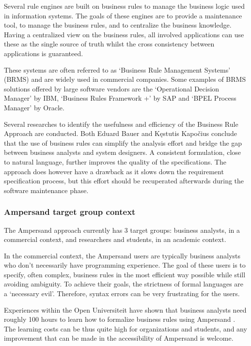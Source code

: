 Several rule engines are built on business rules to manage the business logic used in information systems. 
The goals of these engines are to provide a maintenance tool, to manage the business rules, and to centralize the business knowledge.
Having a centralized view on the business rules, all involved  applications can use these as the single source of truth whilst the cross consistency between applications is guaranteed.

%
These systems are often referred to as `Business Rule Management Systems' (BRMS) and are widely used in commercial companies.
%
Some examples of BRMS solutions offered by large software vendors are the `Operational Decision Manager' by IBM, `Business Rules Framework +' by SAP and `BPEL Process Manager' by Oracle.

Several researches to identify the usefulness and efficiency of the Business Rule Approach are conducted.
Both Eduard Bauer  and Kęstutis Kapočius  conclude that the use of business rules can simplify the analysis effort and bridge the gap between business analysts and system designers. 
A consistent formulation, close to natural language, further improves the quality of the specifications.
The approach does however have a drawback as it slows down the requirement specification process, but this effort should be recuperated afterwards during the software maintenance phase.

\subsubsection{Ampersand target group context}
The Ampersand approach currently has 3 target groups: business analysts, in a commercial context, and researchers and students, in an academic context.

In the commercial context, the Ampersand users are typically business analysts who don't necessarily have programming experience.
The goal of these users is to specify, often complex, business rules in the most efficient way possible while still avoiding ambiguity.
To achieve their goals, the strictness of formal languages are a `necessary evil'.
Therefore, syntax errors can be very frustrating for the users.

Experiences within the Open Universiteit have shown that business analysts need roughly 100 hours to learn how to formalize business rules using Ampersand .
The learning costs can be thus quite high for organizations and students, and any improvement that can be made in the accessibility of Ampersand is welcome.

